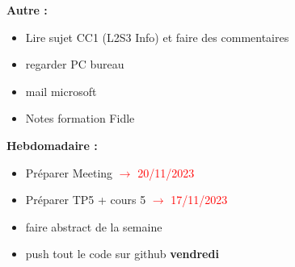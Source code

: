 \textbf{Autre :}
\begin{itemize}[label=$\square$] 
	\item[\done] Lire sujet CC1 (L2S3 Info) et faire des commentaires
	\item[\done] regarder PC bureau
	\item[\done] mail microsoft
	\item Notes formation Fidle
\end{itemize}
\textbf{Hebdomadaire :}
\begin{itemize}[label=$\square$] 
	\item[\wontfix] Préparer Meeting \textcolor{red}{$\rightarrow$ 20/11/2023}
	\item[\done] Préparer TP5 + cours 5 \textcolor{red}{$\rightarrow$ 17/11/2023}
	\item[\done] faire abstract de la semaine 
	\item[\done] push tout le code sur github \textbf{vendredi}
\end{itemize}